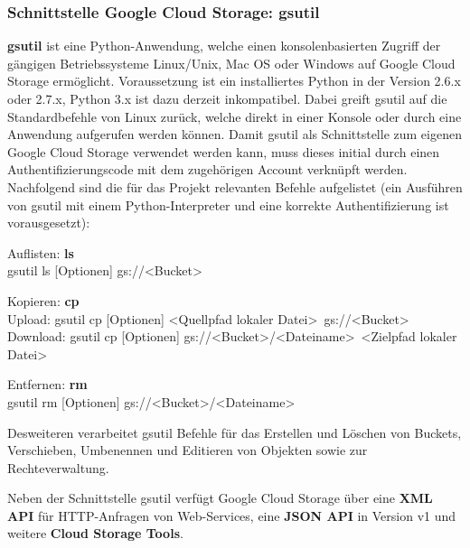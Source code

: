 \documentclass[12pt,a4paper,bibliography=totocnumbered,listof=totocnumbered]{scrartcl}
\begin{document}
\subsubsection{Schnittstelle Google Cloud Storage: gsutil}
\textbf{gsutil} \cite{32} ist eine Python-Anwendung, welche einen konsolenbasierten Zugriff der gängigen Betriebssysteme Linux/Unix, Mac OS oder Windows auf Google Cloud Storage ermöglicht. Voraussetzung ist ein installiertes Python in der Version 2.6.x oder 2.7.x,  Python 3.x ist dazu derzeit inkompatibel. Dabei greift gsutil auf die Standardbefehle von Linux zurück, welche direkt in einer Konsole oder durch eine Anwendung aufgerufen werden können. Damit gsutil als Schnittstelle zum eigenen Google Cloud Storage verwendet werden kann, muss dieses initial durch einen Authentifizierungscode mit dem zugehörigen Account verknüpft werden. Nachfolgend sind die für das Projekt relevanten Befehle aufgelistet (ein Ausführen von gsutil mit einem Python-Interpreter und eine korrekte Authentifizierung ist vorausgesetzt):

\begin{compactitem}
	\item Auflisten: \textbf{ls}\\
	gsutil ls [Optionen] gs://\textless Bucket\textgreater
	\item Kopieren: \textbf{cp}\\
	Upload: gsutil cp [Optionen] \textless Quellpfad lokaler Datei\textgreater~gs://\textless Bucket\textgreater\\
	Download:  gsutil cp [Optionen] gs://\textless Bucket\textgreater/\textless Dateiname\textgreater~\textless Zielpfad lokaler Datei\textgreater
	\item Entfernen: \textbf{rm}\\
	gsutil rm [Optionen] gs://\textless Bucket\textgreater /\textless Dateiname\textgreater
\end{compactitem}

Desweiteren verarbeitet gsutil Befehle für das Erstellen und Löschen von Buckets, Verschieben, Umbenennen und Editieren von Objekten sowie zur Rechteverwaltung.

Neben der Schnittstelle gsutil verfügt Google Cloud Storage über eine \textbf{XML API} für HTTP-Anfragen von Web-Services, eine \textbf{JSON API} in Version v1 und weitere \textbf{Cloud Storage Tools}.\\
\end{document}
